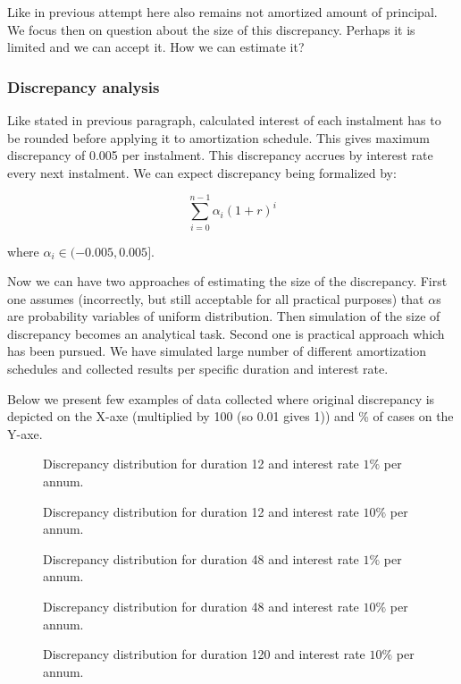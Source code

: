 \documentclass[letterpaper,11pt]{article}
\begin{document}
Like in previous attempt here also remains not amortized amount of principal. We focus then on question about the size of this discrepancy. Perhaps it is limited and we can accept it. How we can estimate it?

\subsubsection {Discrepancy analysis}

Like stated in previous paragraph, calculated interest of each instalment has to be rounded before applying it to amortization schedule. This gives maximum discrepancy of 0.005 per instalment. This discrepancy accrues by interest rate every next instalment. We can expect discrepancy being formalized by:

\begin {equation}
\sum_{i=0}^{n-1} \alpha_{i}(1+r)^i
\end{equation}

where $\alpha_i \in (-0.005,0.005]$.

Now we can have two approaches of estimating the size of the discrepancy. First one assumes (incorrectly, but still acceptable for all practical purposes) that $\alpha$s are probability variables of uniform distribution. Then simulation of the size of discrepancy becomes an analytical task.
Second one is practical approach which has been pursued. We have simulated large number of different amortization schedules and collected results per specific duration and interest rate.

Below we present few examples of data collected where original discrepancy is depicted on the X-axe (multiplied by 100 (so 0.01 gives 1)) and \% of cases on the Y-axe.
\begin{center}
\begin{figure}[hp]
   \caption{Discrepancy distribution for duration 12 and interest rate $1\%$ per annum.}
\end{figure}
\begin{figure}[hp]
   \caption{Discrepancy distribution for duration 12 and interest rate $10\%$ per annum.}
\end{figure}
\begin{figure}[hp]   
   \caption{Discrepancy distribution for duration 48 and interest rate $1\%$ per annum.}
\end{figure}
\begin{figure}[hp]   
   \caption{Discrepancy distribution for duration 48 and interest rate $10\%$ per annum.}   
\end{figure}
\begin{figure}[hp]
   \caption{Discrepancy distribution for duration 120 and interest rate $10\%$ per annum.}
\end{figure}
\end{center}
\end{document}
